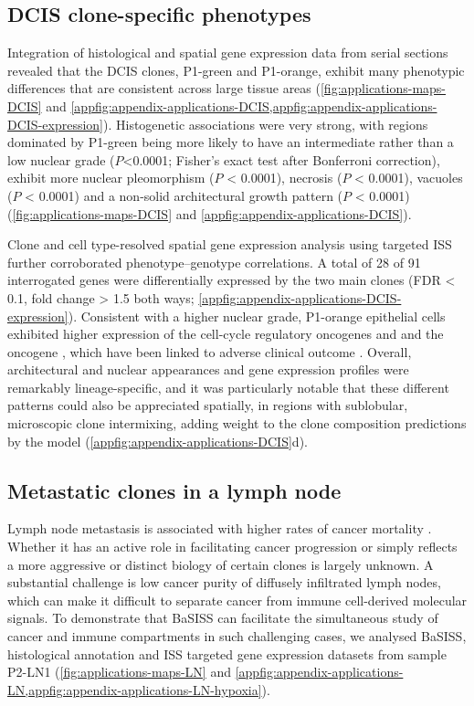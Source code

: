 \subsection{\acs{DCIS} clone-specific phenotypes}

Integration of histological and spatial gene expression data from serial sections revealed that the \ac{DCIS} clones, P1-green and P1-orange, exhibit many phenotypic differences that are consistent across large tissue areas (\cref{fig:applications-maps-DCIS} and \cref{appfig:appendix-applications-DCIS,appfig:appendix-applications-DCIS-expression}). Histogenetic associations were very strong, with regions dominated by P1-green being more likely to have an intermediate rather than a low nuclear grade ($P$<0.0001; Fisher’s exact test after Bonferroni correction), exhibit more nuclear pleomorphism ($P$ < 0.0001), necrosis ($P$ < 0.0001), vacuoles ($P$ < 0.0001) and a non-solid architectural growth pattern ($P$ < 0.0001) (\cref{fig:applications-maps-DCIS} and \cref{appfig:appendix-applications-DCIS}).

Clone and cell type-resolved spatial gene expression analysis using targeted \ac{ISS} further corroborated phenotype–genotype correlations. A total of 28 of 91 interrogated genes were differentially expressed by the two main clones (\ac{FDR} < 0.1, fold change > 1.5 both ways; \cref{appfig:appendix-applications-DCIS-expression}). Consistent with a higher nuclear grade, P1-orange epithelial cells exhibited higher expression of the cell-cycle regulatory oncogenes  and  and the oncogene , which have been linked to adverse clinical outcome \parencite{Solin2013-zy}. Overall, architectural and nuclear appearances and gene expression profiles were remarkably lineage-specific, and it was particularly notable that these different patterns could also be appreciated spatially, in regions with sublobular, microscopic clone intermixing, adding weight to the clone composition predictions by the model (\cref{appfig:appendix-applications-DCIS}d).

\subsection{Metastatic clones in a lymph node}
\label{sec:applications-LN}
Lymph node metastasis is associated with higher rates of cancer mortality \parencite{Jatoi1999-yr}. Whether it has an active role in facilitating cancer progression or simply reflects a more aggressive or distinct biology of certain clones is largely unknown. A substantial challenge is low cancer purity of diffusely infiltrated lymph nodes, which can make it difficult to separate cancer from immune cell-derived molecular signals. To demonstrate that \ac{BaSISS} can facilitate the simultaneous study of cancer and immune compartments in such challenging cases, we analysed \ac{BaSISS}, histological annotation and \ac{ISS} targeted gene expression datasets from sample P2-LN1 (\cref{fig:applications-maps-LN} and \cref{appfig:appendix-applications-LN,appfig:appendix-applications-LN-hypoxia}).

